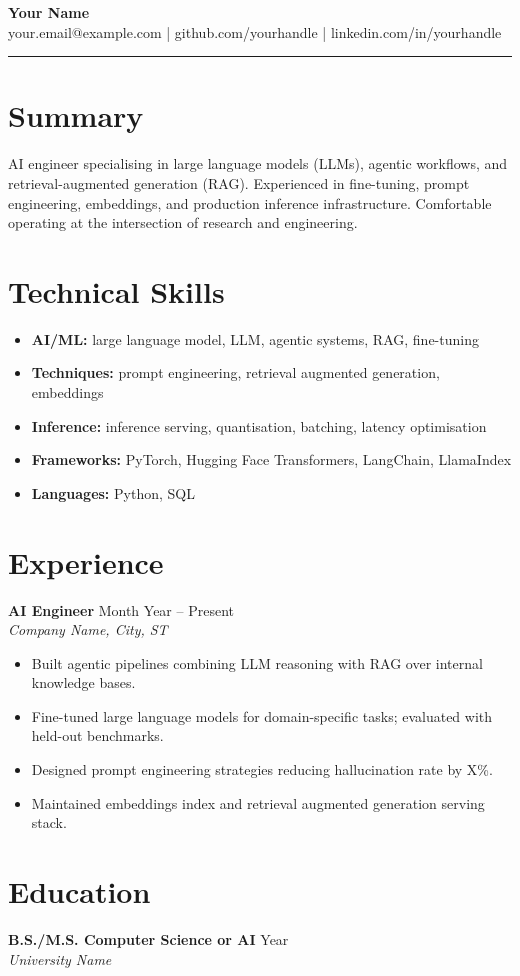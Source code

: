 \documentclass[11pt,letterpaper]{article}
\begin{document}
{\Large \textbf{Your Name}} \\
your.email@example.com \quad | \quad github.com/yourhandle \quad | \quad linkedin.com/in/yourhandle

\bigskip
\hrule
\bigskip

\section*{Summary}
AI engineer specialising in large language models (LLMs), agentic workflows, and
retrieval-augmented generation (RAG). Experienced in fine-tuning, prompt engineering,
embeddings, and production inference infrastructure. Comfortable operating at the
intersection of research and engineering.

\section*{Technical Skills}
\begin{itemize}[leftmargin=*]
  \item \textbf{AI/ML:} large language model, LLM, agentic systems, RAG, fine-tuning
  \item \textbf{Techniques:} prompt engineering, retrieval augmented generation, embeddings
  \item \textbf{Inference:} inference serving, quantisation, batching, latency optimisation
  \item \textbf{Frameworks:} PyTorch, Hugging Face Transformers, LangChain, LlamaIndex
  \item \textbf{Languages:} Python, SQL
\end{itemize}

\section*{Experience}

\textbf{AI Engineer} \hfill Month Year -- Present \\
\textit{Company Name, City, ST}
\begin{itemize}[leftmargin=*]
  \item Built agentic pipelines combining LLM reasoning with RAG over internal knowledge bases.
  \item Fine-tuned large language models for domain-specific tasks; evaluated with held-out benchmarks.
  \item Designed prompt engineering strategies reducing hallucination rate by X\%.
  \item Maintained embeddings index and retrieval augmented generation serving stack.
\end{itemize}

\section*{Education}
\textbf{B.S./M.S. Computer Science or AI} \hfill Year \\
\textit{University Name}
\end{document}
